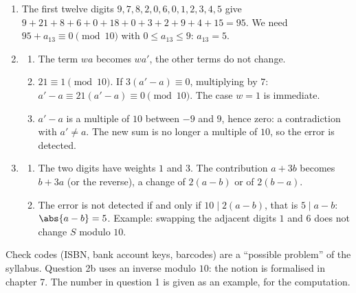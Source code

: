 \begin{solution}[Problem]
\begin{enumerate}
\item The first twelve digits $9,7,8,2,0,6,0,1,2,3,4,5$ give $9+21+8+6+0+18+0+3+2+9+4+15=95$. We need $95+a_{13}\equiv0\pmod{10}$ with $0\le a_{13}\le9$: $a_{13}=5$.
\item
\begin{enumerate}
\item The term $wa$ becomes $wa'$, the other terms do not change.
\item $21\equiv1\pmod{10}$. If $3(a'-a)\equiv0$, multiplying by $7$: $a'-a\equiv21(a'-a)\equiv0\pmod{10}$. The case $w=1$ is immediate.
\item $a'-a$ is a multiple of $10$ between $-9$ and $9$, hence zero: a contradiction with $a'\neq a$. The new sum is no longer a multiple of $10$, so the error is detected.
\end{enumerate}
\item
\begin{enumerate}
\item The two digits have weights $1$ and $3$. The contribution $a+3b$ becomes $b+3a$ (or the reverse), a change of $2(a-b)$ or of $2(b-a)$.
\item The error is not detected if and only if $10\mid2(a-b)$, that is $5\mid a-b$: $\abs{a-b}=5$. Example: swapping the adjacent digits $1$ and $6$ does not change $S$ modulo $10$.
\end{enumerate}
\end{enumerate}
\end{solution}
\begin{teachernote}
Check codes (ISBN, bank account keys, barcodes) are a ``possible problem'' of the syllabus. Question 2b uses an inverse modulo $10$: the notion is formalised in chapter 7. The number in question 1 is given as an example, for the computation.
\end{teachernote}
